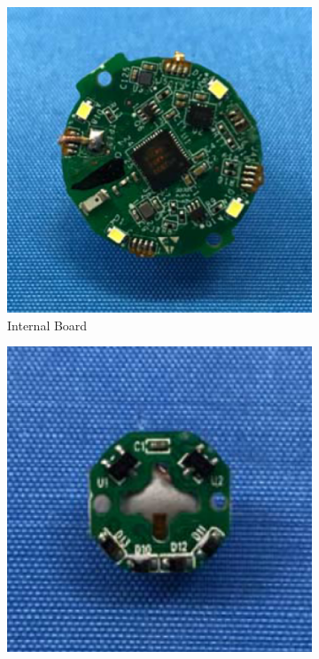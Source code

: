 \begin{figure}
    \centering
    \begin{subfigure}{0.25\textwidth}
        \centering
        \includegraphics[width=.90\linewidth]{Figures/3 State of the Art/gocube-core.png}
        \caption{Internal Board}
        \label{fig:gocube-core}
    \end{subfigure}%
    \begin{subfigure}{0.25\textwidth}
        \centering
        \includegraphics[width=.90\linewidth]{Figures/3 State of the Art/gocube-cap-chip.png}

\end{subfigure}
\end{figure}
